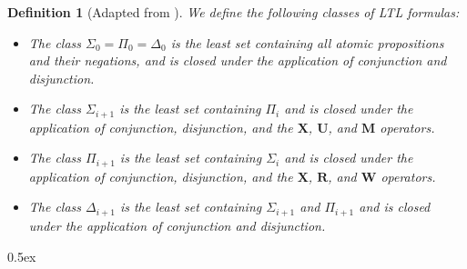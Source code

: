 \documentclass[11pt,a4paper]{article}
\newcommand{\X}{{\ensuremath{\mathbf{X}}}}
\newcommand{\UU}{{\ensuremath{\mathbf{U}}}}
\newcommand{\W}{{\ensuremath{\mathbf{W}}}}
\newcommand{\M}{{\ensuremath{\mathbf{M}}}}
\newcommand{\R}{{\ensuremath{\mathbf{R}}}}
\newtheorem{definition}[theorem]{Definition}
\begin{document}
\begin{definition}[Adapted from \cite{DBLP:conf/mfcs/CernaP03}]
\label{def:future_hierarchy}
We define the following classes of LTL formulas:
\begin{itemize}
	\item The class $\Sigma_0 = \Pi_0 = \Delta_0$ is the least set containing all atomic propositions and their negations, and is closed under the application of conjunction and disjunction.
	\item The class $\Sigma_{i+1}$ is the least set containing $\Pi_i$ and is closed under the application of conjunction, disjunction, and the $\X$, $\UU$, and $\M$ operators.
	\item The class $\Pi_{i+1}$ is the least set containing $\Sigma_i$ and is closed under the application of conjunction, disjunction, and the $\X$, $\R$, and $\W$ operators.
	\item The class $\Delta_{i+1}$ is the least set containing $\Sigma_{i+1}$ and $\Pi_{i+1}$ and is closed under the application of conjunction and disjunction.
\end{itemize}
\end{definition}

\parindent 0pt\parskip 0.5ex





\end{document}
